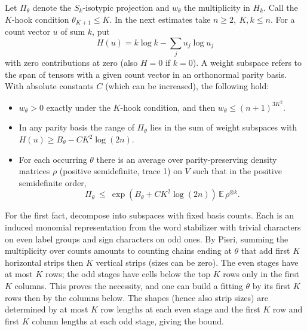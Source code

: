 Let \(\Pi_\theta\) denote the \(S_k\)-isotypic projection and \(w_\theta\) the multiplicity in \(H_k\). Call the \(K\)-hook condition \(\theta_{K+1}\le K\). In the next estimates take \(n\ge 2,\ K,k\le n\). For a count vector \(u\) of sum \(k\), put
\[
 H(u)= k\log k-\sum_j u_j\log u_j
\]
with zero contributions at zero (also \(H=0\) if \(k=0\)). A weight subspace refers to the span of tensors with a given count vector in an orthonormal parity basis. With absolute constants \(C\) (which can be increased), the following hold:
\begin{itemize}
\item \(w_\theta>0\) exactly under the \(K\)-hook condition, and then \(w_\theta\le(n+1)^{3K^2}\).
\item In any parity basis the range of \(\Pi_\theta\) lies in the sum of weight subspaces with \(H(u)\ge B_\theta-C K^2\log(2n)\).
\item For each occurring \(\theta\) there is an average over parity-preserving density matrices \(\rho\) (positive semidefinite, trace 1) on \(V\) such that in the positive semidefinite order,
\begin{equation}
 \Pi_\theta\ \le\ \exp(B_\theta+C K^2\log(2n))\,\mathbb E\,\rho^{\otimes k}.       \label{ten:simultaneous:eq:3}
\end{equation}
\end{itemize}

For the first fact, decompose into subspaces with fixed basis counts. Each is an induced monomial representation from the word stabilizer with trivial characters on even label groups and sign characters on odd ones. By Pieri, summing the multiplicity over counts amounts to counting chains ending at \(\theta\) that add first \(K\) horizontal strips then \(K\) vertical strips (sizes can be zero). The even stages have at most \(K\) rows; the odd stages have cells below the top \(K\) rows only in the first \(K\) columns. This proves the necessity, and one can build a fitting \(\theta\) by its first \(K\) rows then by the columns below. The shapes (hence also strip sizes) are determined by at most \(K\) row lengths at each even stage and the first \(K\) row and first \(K\) column lengths at each odd stage, giving the bound.

